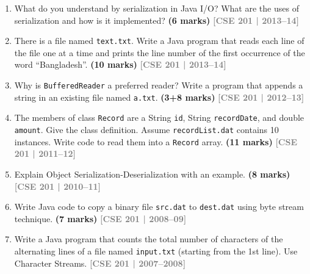 \documentclass[12pt,a3paper]{article}
\newcommand{\yr}[1]{\hfill\textcolor{gray}{\small\textbf{[#1]}}}
\newcommand{\mk}[1]{\textcolor{orange!70!black}{\small\textbf{(#1 marks)}}}
\begin{document}
\begin{enumerate}
\item What do you understand by serialization in Java I/O? What are the uses of serialization and how is it implemented? \mk{6}
\yr{CSE 201 | 2013--14}




\item There is a file named \texttt{text.txt}. Write a Java program that reads each line of the file one at a time and prints the line number of the first occurrence of the word ``Bangladesh''. \mk{10}
\yr{CSE 201 | 2013--14}





\item Why is \texttt{BufferedReader} a preferred reader? Write a program that appends a string in an existing file named \texttt{a.txt}. \mk{3+8}
\yr{CSE 201 | 2012--13}





\item The members of class \texttt{Record} are a String \texttt{id}, String \texttt{recordDate}, and double \texttt{amount}. Give the class definition. Assume \texttt{recordList.dat} contains 10 instances. Write code to read them into a \texttt{Record} array. \mk{11}
\yr{CSE 201 | 2011--12}




\item Explain Object Serialization-Deserialization with an example. \mk{8}
\yr{CSE 201 | 2010--11}




\item Write Java code to copy a binary file \texttt{src.dat} to \texttt{dest.dat} using byte stream technique. \mk{7}
\yr{CSE 201 | 2008--09}






\item Write a Java program that counts the total number of characters of the alternating lines of a file named \texttt{input.txt} (starting from the 1st line). Use Character Streams.
\yr{CSE 201 | 2007--2008}





\end{enumerate}
\newpage
\end{document}
